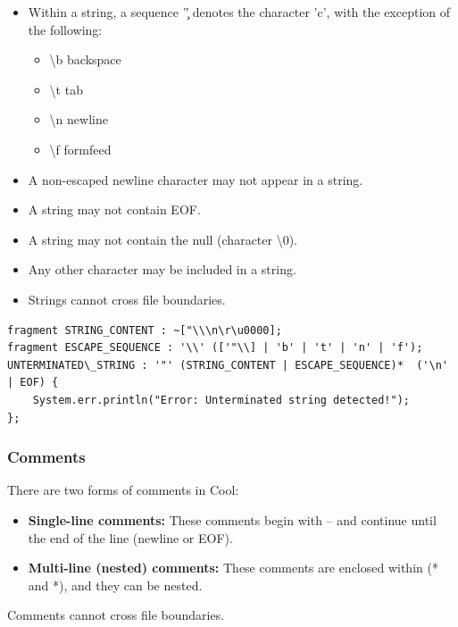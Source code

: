 \documentclass[titlepage]{article}
\begin{document}
\begin{itemize}
    \item Within a string, a sequence '\c' denotes the character 'c', with the exception of the following:
    \begin{itemize}
        \item \textbackslash{b} backspace
        \item \textbackslash{t} tab
        \item \textbackslash{n} newline
        \item \textbackslash{f} formfeed
    \end{itemize}
    \item A non-escaped newline character may not appear in a string.
    \item A string may not contain EOF. 
    \item A string may not contain the null (character \textbackslash{0}). 
    \item Any other character may be included in a string. 
    \item Strings cannot cross file boundaries.
\end{itemize}

\begin{lstlisting}[basicstyle=\ttfamily]
fragment STRING_CONTENT : ~["\\\n\r\u0000];
fragment ESCAPE_SEQUENCE : '\\' (['"\\] | 'b' | 't' | 'n' | 'f');
UNTERMINATED\_STRING : '"' (STRING_CONTENT | ESCAPE_SEQUENCE)*  ('\n' | EOF) { 
    System.err.println("Error: Unterminated string detected!"); 
};
\end{lstlisting}

\subsubsection{Comments}

There are two forms of comments in Cool:
\begin{itemize}
    \item \textbf{Single-line comments:} These comments begin with -- and continue until the end of the line (newline or EOF).
    \item \textbf{Multi-line (nested) comments:} These comments are enclosed within (* and *), and they can be nested.
\end{itemize}

Comments cannot cross file boundaries.
\end{document}
